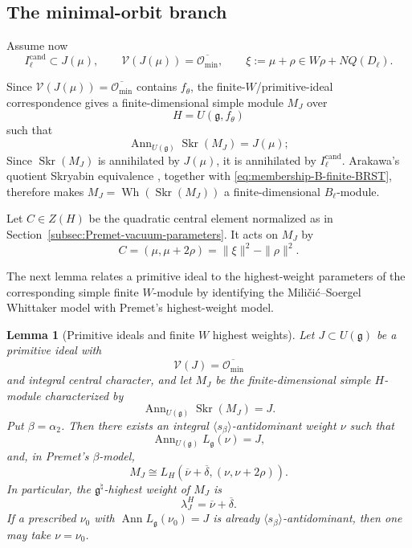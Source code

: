 \documentclass[11pt]{amsart}
\newtheorem{lemma}[theorem]{Lemma}
\theoremstyle{remark}
\numberwithin{equation}{section}
\begin{document}
\subsection{The minimal-orbit branch}

Assume now
\begin{equation}
\label{eq:minimal-orbit-assumptions}
   I_\ell^{\mathrm{cand}}\subset J(\mu),
   \qquad
   \mathcal V(J(\mu))
   =
   \overline{\mathcal O_{\min}},
   \qquad
   \xi:=\mu+\rho\in W\rho+NQ(D_\ell).
\end{equation}

Since \(\mathcal V(J(\mu))=\overline{\mathcal O_{\min}}\) contains
\(f_\theta\), the finite-\(W\)/primitive-ideal correspondence
\cite[Proposition~3.1]{Petukhov2018} gives a finite-dimensional simple module
\(M_J\) over
\[
   H=U(\mathfrak g,f_\theta)
\]
such that
\begin{equation}
   \operatorname{Ann}_{U(\mathfrak g)}
   \operatorname{Skr}(M_J)
   =
   J(\mu);
\end{equation}
Since \(\operatorname{Skr}(M_J)\) is annihilated by \(J(\mu)\), it is
annihilated by \(I_\ell^{\mathrm{cand}}\).  Arakawa's quotient Skryabin
 equivalence \cite[Theorem~3.6]{Arakawa2015}, together with
\eqref{eq:membership-B-finite-BRST}, therefore makes
\(M_J=\operatorname{Wh}(\operatorname{Skr}(M_J))\) a finite-dimensional
\(B_\ell\)-module.

Let \(C\in Z(H)\) be the quadratic central element normalized as in
Section~\ref{subsec:Premet-vacuum-parameters}.  It acts on \(M_J\) by
\begin{equation}
\label{eq:C-HC-eigenvalue}
   C
   =
   (\mu,\mu+2\rho)
   =
   \|\xi\|^2-\|\rho\|^2.
\end{equation}

The next lemma relates a primitive ideal to the highest-weight parameters
of the corresponding simple finite \(W\)-module by identifying the
Mili\v{c}i\'c--Soergel Whittaker model with Premet's highest-weight model.

\begin{lemma}[Primitive ideals and finite \(W\) highest weights]
\label{lem:primitive-finiteW-bridge}
Let \(J\subset U(\mathfrak g)\) be a primitive ideal with
\[
   \mathcal V(J)=\overline{\mathcal O_{\min}}
\]
and integral central character, and let \(M_J\) be the finite-dimensional
simple \(H\)-module characterized by
\[
   \operatorname{Ann}_{U(\mathfrak g)}\operatorname{Skr}(M_J)=J.
\]
Put \(\beta=\alpha_2\).  Then there exists an integral
\(\langle s_\beta\rangle\)-antidominant weight \(\nu\) such that
\[
   \operatorname{Ann}_{U(\mathfrak g)}L_{\mathfrak g}(\nu)=J,
\]
and, in Premet's \(\beta\)-model,
\begin{equation}
\label{eq:primitive-finiteW-highest-bridge}
   M_J
   \cong
   L_H\!\left(
      \overline{\nu}+\overline{\delta},
      (\nu,\nu+2\rho)
   \right).
\end{equation}
In particular, the \(\mathfrak g^\natural\)-highest weight of \(M_J\) is
\[
   \lambda_J^H=\overline{\nu}+\overline{\delta}.
\]
If a prescribed \(\nu_0\) with
\(\operatorname{Ann}L_{\mathfrak g}(\nu_0)=J\) is already
\(\langle s_\beta\rangle\)-antidominant, then one may take
\(\nu=\nu_0\).
\end{lemma}
\end{document}
